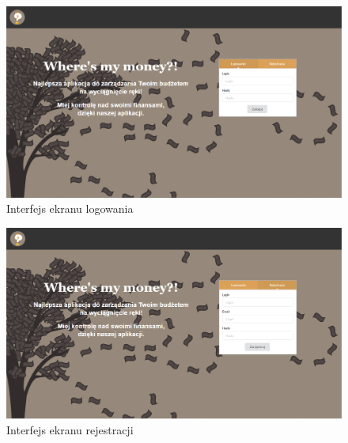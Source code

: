 \documentclass{article}
\begin{document}
	\begin{figure}[H]
		\vspace*{-2cm}
		\hspace*{-2cm}
		\includegraphics[scale=0.45]{assets/mc1.png}
		\caption[]{Interfejs ekranu logowania}
		\label{fig:logowanie}
	\end{figure}
	\begin{figure}[H]
		\hspace*{-2cm}
		\includegraphics[scale=0.45]{assets/mc2.png}
		\caption[]{Interfejs ekranu rejestracji}
		\label{fig:rejestracja}
	\end{figure}
\end{document}
